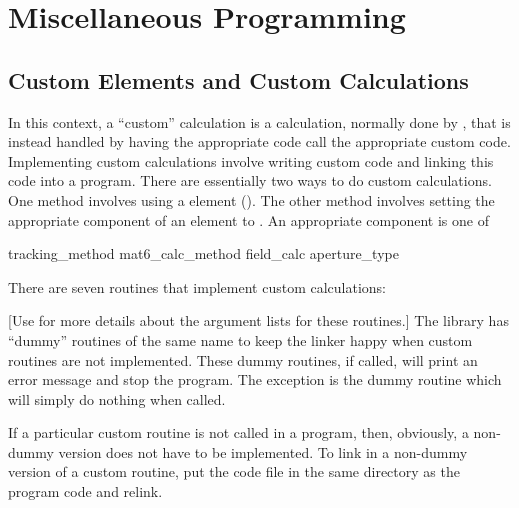 \chapter{Miscellaneous Programming}

\section{Custom Elements and Custom Calculations}
\label{s:custom.ele}

In this context, a ``custom'' calculation is a calculation, normally
done by \bmad, that is instead handled by having the appropriate \bmad
code call the appropriate custom code. Implementing custom
calculations involve writing custom code and linking this code into a
program. There are essentially two ways to do custom calculations. One
method involves using a  element (). The
other method involves setting the appropriate component of an element
to . An appropriate component is one of
\begin{example}
  tracking_method       
  mat6_calc_method      
  field_calc            
  aperture_type         
\end{example}

There are seven routines that implement custom calculations:
\begin{example}
\end{example}
[Use  for more details about the argument lists for these
routines.]  The \bmad library has ``dummy'' routines of the same name to
keep the linker happy when custom routines are not implemented. These
dummy routines, if called, will print an error message and stop the
program. The exception is the dummy  routine which will
simply do nothing when called.

If a particular custom routine is not called in a program, then,
obviously, a non-dummy version does not have to be implemented. To
link in a non-dummy version of a custom routine, put the code file in
the same directory as the program code and relink.

